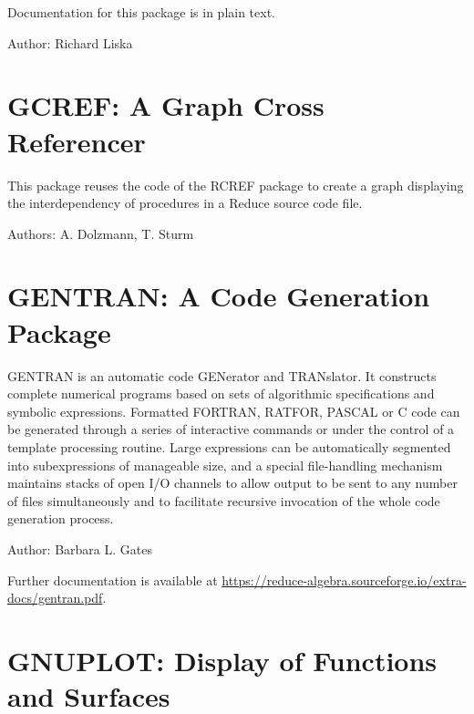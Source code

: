 Documentation for this package is in plain text.

Author: Richard Liska



\newpage

\section{GCREF: A Graph Cross Referencer}
\label{GCREF}

This package reuses the code of the RCREF package to create a graph displaying
the interdependency of procedures in a Reduce source code file.

Authors: A. Dolzmann, T. Sturm



\newpage

\section{GENTRAN: A Code Generation Package}
\label{GENTRAN}


GENTRAN is an automatic code GENerator and TRANslator. It constructs
complete numerical programs based on sets of algorithmic specifications
and symbolic expressions. Formatted FORTRAN, RATFOR, PASCAL or C code can be
generated through a series of interactive commands or under the control of
a template processing routine. Large expressions can be automatically
segmented into subexpressions of manageable size, and a special
file-handling mechanism maintains stacks of open I/O channels to allow
output to be sent to any number of files simultaneously and to facilitate
recursive invocation of the whole code generation process.

Author: Barbara L. Gates

\begin{sloppypar}
  Further documentation is available at
  \url{https://reduce-algebra.sourceforge.io/extra-docs/gentran.pdf}.
\end{sloppypar}


\iffalse
\newpage

\section{GNUPLOT: Display of Functions and Surfaces}

